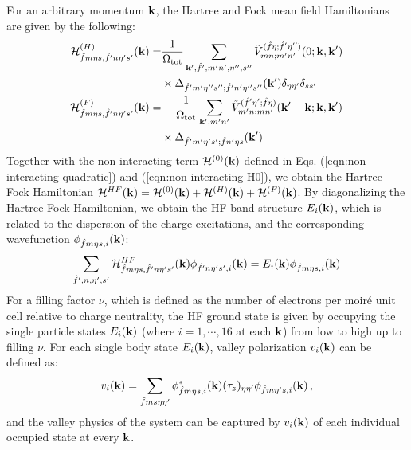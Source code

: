 \documentclass[prb,aps,nofootinbib,amssymb,twocolumn,superscriptaddress,10pt]{revtex4-2}
\begin{document}
For an arbitrary momentum $\mathbf{k}$, the Hartree and Fock mean field Hamiltonians are given by the following:
 \begin{align}
	\mathcal{H}^{(H)}_{\hat{f}m\eta s,\hat{f}'n\eta's'}(\mathbf{k}) =& \frac{1}{\Omega_{\rm tot}}\sum_{\mathbf{k}', \hat{f}',m'n',\eta'', s''}\tilde{V}^{(\hat{f}\eta;\hat{f}'\eta'')}_{mn;m'n'}(0; \mathbf{k},\mathbf{k}') \nonumber\\
	&\times\Delta_{\hat{f}'m'\eta''s'';\hat{f}'n'\eta''s''}(\mathbf{k}') \delta_{\eta\eta'}\delta_{ss'} \\
	\mathcal{H}^{(F)}_{\hat{f}m\eta s,\hat{f}'n\eta's'}(\mathbf{k}) =& -\frac{1}{\Omega_{\rm tot}}\sum_{\mathbf{k}',m'n'}\tilde{V}^{(\hat{f}'\eta';\hat{f}\eta)}_{m'n;mn'}(\mathbf{k}'-\mathbf{k};\mathbf{k},\mathbf{k}')\nonumber\\
	&\times \Delta_{\hat{f}'m'\eta's'; \hat{f}n'\eta s}(\mathbf{k}') 
\end{align}
Together with the non-interacting term $\mathcal{H}^{(0)}(\mathbf{k})$ defined in Eqs. (\ref{eqn:non-interacting-quadratic}) and (\ref{eqn:non-interacting-H0}), we obtain the Hartree Fock Hamiltonian $\mathcal{H}^{HF}(\mathbf{k}) = \mathcal{H}^{(0)}(\mathbf{k}) + \mathcal{H}^{(H)}(\mathbf{k}) + \mathcal{H}^{(F)}(\mathbf{k})$. By diagonalizing the Hartree Fock Hamiltonian, we obtain the HF band structure $E_i(\mathbf{k})$, which is related to the dispersion of the charge excitations, and the corresponding wavefunction $\phi_{\hat{f} m \eta s, i}(\mathbf{k})$:
\begin{equation}
	\sum_{\hat{f}',n,\eta',s'}\mathcal{H}^{HF}_{\hat{f}m\eta s, \hat{f}'n\eta's'}(\mathbf{k}) \phi_{\hat{f}'n\eta's', i}(\mathbf{k}) = E_i(\mathbf{k})\phi_{\hat{f}m\eta s, i}(\mathbf{k})
\end{equation}
For a filling factor $\nu$, which is defined as the number of electrons per moir\'e unit cell relative to charge neutrality, the HF ground state is given by occupying the single particle states $E_i(\mathbf{k})$ (where $i=1,\cdots, 16$ at each $\mathbf{k}$) from low to high up to filling $\nu$. For each single body state $E_i(\mathbf{k})$, valley polarization $v_i(\mathbf{k})$ can be defined as:
\begin{equation}\label{eqn:def_singlevp}
	v_i(\mathbf{k}) = \sum_{\hat{f} m s \eta\eta'}\phi^*_{\hat{f} m \eta s, i}(\mathbf{k}) (\tau_z)_{\eta\eta'}\phi_{\hat{f} m\eta's, i}(\mathbf{k})\,,
\end{equation}
and the valley physics of the system can be captured by $v_i(\mathbf{k})$ of each individual occupied state at every $\mathbf{k}$. 
\end{document}
